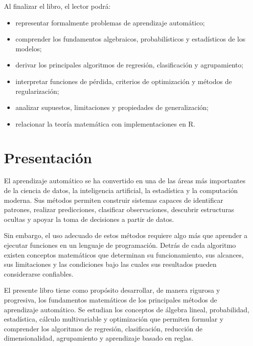 \documentclass[
  spanish,
  11pt,
  letterpaper,
  DIV=11,
  numbers=noendperiod]{scrreprt}
\providecommand{\tightlist}{%
  \setlength{\itemsep}{0pt}\setlength{\parskip}{0pt}}
\theoremstyle{definition}
\theoremstyle{plain}
\theoremstyle{definition}
\theoremstyle{remark}
\begin{document}

Al finalizar el libro, el lector podrá:

\begin{itemize}
\tightlist
\item
  representar formalmente problemas de aprendizaje automático;
\item
  comprender los fundamentos algebraicos, probabilísticos y estadísticos
  de los modelos;
\item
  derivar los principales algoritmos de regresión, clasificación y
  agrupamiento;
\item
  interpretar funciones de pérdida, criterios de optimización y métodos
  de regularización;
\item
  analizar supuestos, limitaciones y propiedades de generalización;
\item
  relacionar la teoría matemática con implementaciones en R.
\end{itemize}


\chapter{Presentación}\label{presentaciuxf3n}

El aprendizaje automático se ha convertido en una de las áreas más
importantes de la ciencia de datos, la inteligencia artificial, la
estadística y la computación moderna. Sus métodos permiten construir
sistemas capaces de identificar patrones, realizar predicciones,
clasificar observaciones, descubrir estructuras ocultas y apoyar la toma
de decisiones a partir de datos.

Sin embargo, el uso adecuado de estos métodos requiere algo más que
aprender a ejecutar funciones en un lenguaje de programación. Detrás de
cada algoritmo existen conceptos matemáticos que determinan su
funcionamiento, sus alcances, sus limitaciones y las condiciones bajo
las cuales sus resultados pueden considerarse confiables.

El presente libro tiene como propósito desarrollar, de manera rigurosa y
progresiva, los fundamentos matemáticos de los principales métodos de
aprendizaje automático. Se estudian los conceptos de álgebra lineal,
probabilidad, estadística, cálculo multivariable y optimización que
permiten formular y comprender los algoritmos de regresión,
clasificación, reducción de dimensionalidad, agrupamiento y aprendizaje
basado en reglas.
\end{document}
